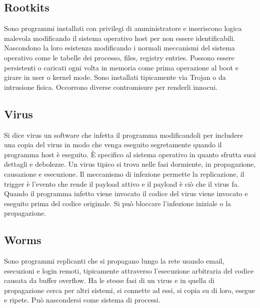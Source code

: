 \subsection{Rootkits}
Sono programmi installati con privilegi di amministratore e inseriscono logica malevola modificando il sistema operativo host per non essere identificabili. Nascondono la loro esistenza
modificando i normali meccanismi del sistema operativo come le tabelle dei processo, files, registry entries. Possono essere persistenti o caricati ogni volta in memoria come prima 
operazione al boot e girare in user o kernel mode. Sono installati tipicamente via Trojan o da intrusione fisica. Occorrono diverse contromisure per renderli innocui. 
\subsection{Virus}
Si dice virus un software che infetta il programma modificandoli per includere una copia del virus in modo che venga eseguito segretamente quando il programma host \`e eseguito. \`E
specifico al sistema operativo in quanto sfrutta suoi dettagli e debolezze. Un virus tipico si trova nelle fasi dormiente, in propagazione, causazione e esecuzione. Il meccanismo di 
infezione permette la replicazione, il trigger \`e l'evento che rende il payload attivo e il payload \`e ci\`o che il virus fa. Quando il programma infetto viene invocato il codice del 
virus viene invocato e eseguito prima del codice originale. Si pu\`o bloccare l'infezione iniziale o la propagazione. 
\subsection{Worms}
Sono programmi replicanti che si propagano lungo la rete usando email, esecuzioni e login remoti, tipicamente attraverso l'esecuzione arbitraria del codice causata da buffer overflow. 
Ha le stesse fasi di un virus e in quella di propagazione cerca per altri sistemi, si connette ad essi, si copia su di loro, esegue e ripete. Pu\`o nascondersi come sistema di processi.
